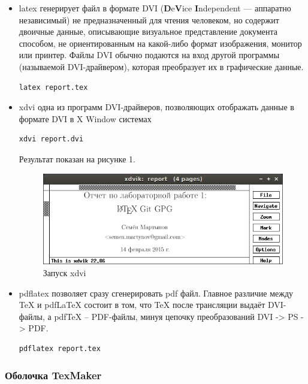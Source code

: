 \documentclass[a4paper, 12pt]{article}		%
\begin{document}
\begin{itemize}
	\item{ latex генерирует файл в формате DVI (\textbf{D}e\textbf{V}ice \textbf{I}ndependent — аппаратно независимый) не предназначенный для чтения человеком, но содержит двоичные данные, описывающие визуальное представление документа способом, не ориентированным на какой-либо формат изображения, монитор или принтер.  Файлы DVI обычно подаются на вход другой программы (называемой DVI-драйвером), которая преобразует их в графические данные.
	\begin{verbatim}latex report.tex
	\end{verbatim}}
	
	\item {xdvi одна из программ DVI-драйверов, позволяющих отображать данные в формате DVI в X Window системах
	\begin{verbatim}xdvi report.dvi
	\end{verbatim}
	
	Результат показан на рисунке 1.
	
	\begin{figure}[h!]
	\centering
	\includegraphics[scale=0.83]{res/xdvi}
	\caption{Запуск xdvi}
	\end{figure}
	}
	
	\item {pdflatex позволяет сразу сгенерировать pdf файл. Главное различие между TeX и pdfLaTeX состоит в том, что TeX после трансляции выдаёт DVI-файлы, а pdfTeX -- PDF-файлы, минуя цепочку преобразований DVI -> PS -> PDF.
	\begin{verbatim}pdflatex report.tex
	\end{verbatim}}

\end{itemize}

\subsubsection{Оболочка TexMaker}
\end{document}
